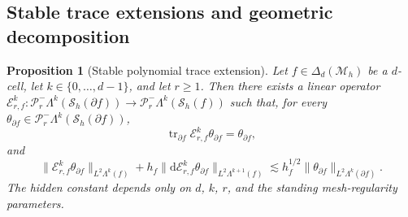 \documentclass[a4paper,11pt]{article}
\newtheorem{proposition}[theorem]{Proposition}
\theoremstyle{definition}
\newcommand{\DIFF}{\mathrm{d}}
\newcommand{\Mh}{\mathcal{M}_h}
\newcommand{\Sh}{\mathcal{S}_h}
\newcommand{\FM}[1]{\Delta_{#1}}
\newcommand{\PLtrim}[2]{\mathcal{P}_{#1}^{-}\Lambda^{#2}}
\newcommand{\trc}{\operatorname{tr}}
\begin{document}
\subsection{Stable trace extensions and geometric decomposition}
\label{subsubsec:geometric.decomposition}

\begin{proposition}[Stable polynomial trace extension]
\label{lem:stable.polynomial.trace.extension}
Let $f\in\FM{d}(\Mh)$ be a $d$-cell, let $k\in\{0,\ldots,d-1\}$, and let $r\geq1$.
Then there exists a linear operator $\mathcal E_{r,f}^k:\PLtrim{r}{k}(\Sh(\partial f))\to\PLtrim{r}{k}(\Sh(f))$ such that, for every $\theta_{\partial f}\in\PLtrim{r}{k}(\Sh(\partial f))$,
\begin{equation}\label{eq:trace.extension.trace}
  \trc_{\partial f}\mathcal E_{r,f}^k\theta_{\partial f}
  =
  \theta_{\partial f},
\end{equation}
and
\begin{equation}\label{eq:trace.extension.stability}
  \|\mathcal E_{r,f}^k\theta_{\partial f}\|_{L^2\Lambda^k(f)}
  +
  h_f\|\DIFF\mathcal E_{r,f}^k\theta_{\partial f}\|_{L^2\Lambda^{k+1}(f)}
  \lesssim
  h_f^{1/2}\|\theta_{\partial f}\|_{L^2\Lambda^k(\partial f)}.
\end{equation}
The hidden constant depends only on $d$, $k$, $r$, and the standing mesh-regularity parameters.
\end{proposition}
\end{document}
